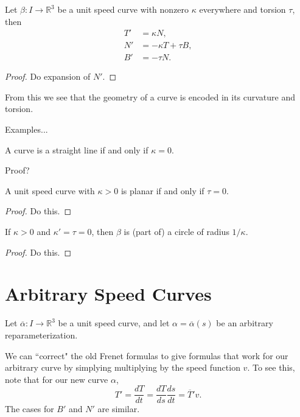 \documentclass[twoside,10pt]{report}
\begin{document}
\begin{thrm}
Let $\beta:I \to \mathbb{R}^3$ be a unit speed curve with nonzero $\kappa$ everywhere and torsion $\tau$, then
\begin{align*}
	T' &= \kappa N, \\
	N' &= -\kappa T + \tau B, \\
	B' &= -\tau N.
\end{align*}
\end{thrm}
\begin{proof}
	{\color{red}Do expansion of $N'$.}
\end{proof}

From this we see that the geometry of a curve is encoded in its curvature and torsion.

{\color{red}Examples...}

\begin{prop}
A curve is a straight line if and only if $\kappa=0$.
\end{prop}
{\color{red}Proof?}

\begin{prop}
 	A unit speed curve with $\kappa>0$ is planar if and only if $\tau = 0$.
\end{prop}
\begin{proof}
	{\color{red}Do this.}
\end{proof}

\begin{lem}
	If $\kappa>0$ and $\kappa'=\tau=0$, then $\beta$ is (part of) a circle of radius $1/\kappa$.
\end{lem}
\begin{proof}
	{\color{red}Do this.}
\end{proof}


\section{Arbitrary Speed Curves}

Let $\overline{\alpha} :I\to \mathbb{R}^3$ be a unit speed curve, and let $\alpha=\overline{\alpha}(s)$ be an arbitrary reparameterization. 

We can ``correct" the old Frenet formulas to give formulas that work for our arbitrary curve by simplying multiplying by the speed function $v$. To see this, note that for our new curve $\alpha$,
\[
T' = \frac{d T}{d t} = \frac{d T}{d s} \frac{d s}{d t} = \overline{T}'v.
\] 
The cases for $B'$ and $N'$ are similar.
\end{document}
